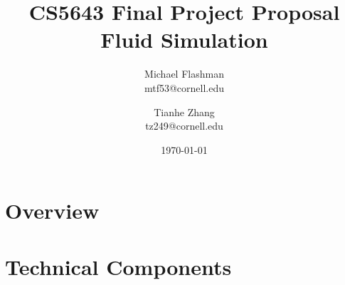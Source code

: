 \documentclass[11pt]{article}
\begin{document}
\title{CS5643 Final Project Proposal \\ Fluid Simulation}
\author{Michael Flashman \\ mtf53@cornell.edu \and Tianhe Zhang \\ tz249@cornell.edu\\}
\date{\today}
\maketitle


\section{Overview}


\section{Technical Components}



\begin{thebibliography}{11}


\end{thebibliography}
\end{document}
